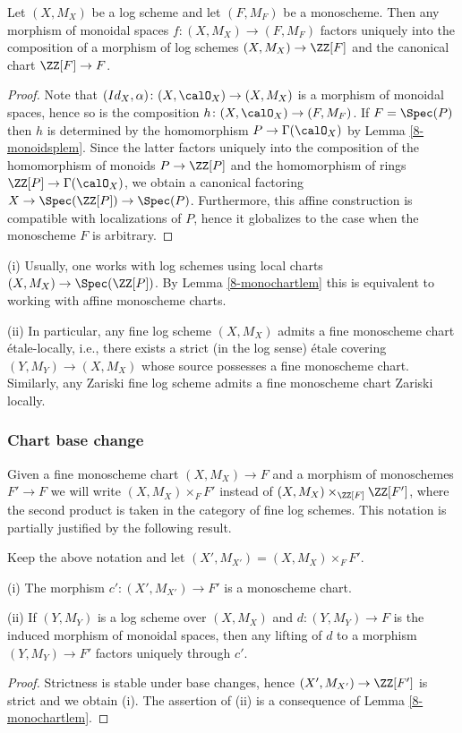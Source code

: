 \documentclass[10pt]{../fichiers-configuration-latex/smfart}
\begin{document}
\begin{lemma2}\label{8-monochartlem} Let $(X,M_X)$ be a log scheme
and let $(F,M_F)$ be a monoscheme. Then any morphism of monoidal
spaces $f{\colon}(X,M_X)\to(F,M_F)$ factors uniquely into the
composition of a morphism of log schemes $(X,M_X)\to\ZZ[F]$ and
the canonical chart $\ZZ[F]\to F$.  \end{lemma2} \begin{proof}
Note that $(Id_X,\alpha){\colon}(X,\calO_X)\to(X,M_X)$ is
a morphism of monoidal spaces, hence so is the composition
$h{\colon}(X,\calO_X)\to(F,M_F)$. If $F=\Spec(P)$ then $h$ is
determined by the homomorphism $P\to\Gamma(\calO_X)$ by Lemma
\ref{8-monoidsplem}. Since the latter factors uniquely into the
composition of the homomorphism of monoids $P\to\ZZ[P]$ and the
homomorphism of rings $\ZZ[P]\to\Gamma(\calO_X)$, we obtain a
canonical factoring $X\to\Spec(\ZZ[P])\to\Spec(P)$. Furthermore,
this affine construction is compatible with localizations of $P$,
hence it globalizes to the case when the monoscheme $F$ is arbitrary.
\end{proof}

\begin{remark2}\label{8-usualchartrem} (i) Usually, one works with
log schemes using local charts $(X,M_X)\to\Spec(\ZZ[P])$. By Lemma
\ref{8-monochartlem} this is equivalent to working with affine
monoscheme charts.

(ii) In particular, any fine log scheme $(X,M_X)$ admits a fine
monoscheme chart \'etale-locally, i.e., there exists a strict (in
the log sense) \'etale covering  $(Y,M_Y)\to(X,M_X)$ whose source
possesses a fine monoscheme chart. Similarly, any Zariski fine log scheme
admits a fine monoscheme chart Zariski locally. \end{remark2}

\subsubsection{Chart base change}\label{8-chartchangesec}
Given a fine monoscheme chart $(X,M_X)\to F$ and a morphism of
monoschemes $F'\to F$ we will write $(X,M_X)\times_FF'$ instead
of $(X,M_X)\times_{\ZZ[F]}\ZZ[F']$, where the second product
is taken in the category of fine log schemes. This notation is
partially justified by the following result.

\begin{lemma2}\label{8-chartbaselem} Keep the above notation and
let $(X',M_{X'})=(X,M_X)\times_FF'$.

(i) The morphism $c'{\colon}(X',M_{X'})\to F'$ is a monoscheme chart.

(ii) If $(Y,M_Y)$ is a log scheme over $(X,M_X)$ and
$d{\colon}(Y,M_Y)\to F$ is the induced morphism of monoidal spaces,
then any lifting of $d$ to a morphism $(Y,M_Y)\to F'$ factors
uniquely through $c'$.  \end{lemma2} \begin{proof} Strictness is
stable under base changes, hence $(X',M_{X'})\to\ZZ[F']$ is strict
and we obtain (i). The assertion of (ii) is a consequence of Lemma
\ref{8-monochartlem}.  \end{proof}
\end{document}
